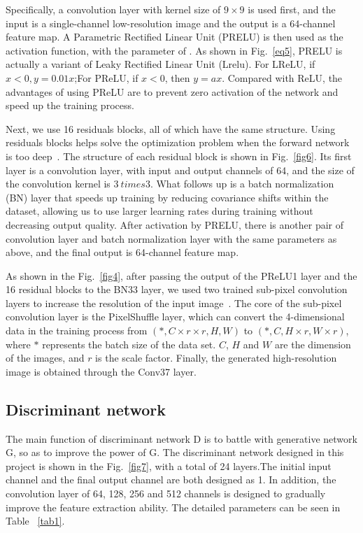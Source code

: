 \documentclass[10pt,twocolumn,letterpaper]{article}
\begin{document}
Specifically, a convolution layer with kernel size of $9\times 9$ is used first, and the input is a single-channel low-resolution image and the output is a 64-channel feature map. A Parametric Rectified Linear Unit (PRELU) is then used as the activation function, with the parameter of . As shown in Fig.~\ref{eq5}, PRELU is actually a variant of Leaky Rectified Linear Unit (Lrelu). For LReLU, if $x<0, y=0.01x$;For PReLU, if $x<0$, then $y=ax$. Compared with ReLU, the advantages of using PReLU are to prevent zero activation of the network and speed up the training process.

Next, we use 16 residuals blocks, all of which have the same structure. Using residuals blocks helps solve the optimization problem when the forward network is too deep~\cite{gross2016training}. The structure of each residual block is shown in Fig.~\ref{fig6}. Its first layer is a convolution layer, with input and output channels of 64, and the size of the convolution kernel is $3 \ times 3$. What follows up is a batch normalization (BN) layer that speeds up training by reducing covariance shifts within the dataset, allowing us to use larger learning rates during training without decreasing output quality\cite{ioffe2015batch}. After activation by PRELU, there is another pair of convolution layer and batch normalization layer with the same parameters as above, and the final output is 64-channel feature map.

As shown in the Fig.~\ref{fig4}, after passing the output of the PReLU1 layer and the 16 residual blocks to the BN33 layer, we used two trained sub-pixel convolution layers to increase the resolution of the input image~\cite{shi2016real}. The core of the sub-pixel convolution layer is the PixelShuffle layer, which can convert the 4-dimensional data in the training process from $(*,C\times r\times r,H,W)$ to $(*,C,H\times r,W\times r)$, where $*$ represents the batch size of the data set. $C$, $H$ and $W$ are the dimension of the images, and $r$ is the scale factor. Finally, the generated high-resolution image is obtained through the Conv37 layer.

\subsection{Discriminant network}
The main function of discriminant network D is to battle with generative network G, so as to improve the power of G. The discriminant network designed in this project is shown in the Fig.~\ref{fig7}, with a total of 24 layers.The initial input channel and the final output channel are both designed as 1. In addition, the convolution layer of 64, 128, 256 and 512 channels is designed to gradually improve the feature extraction ability. The detailed parameters can be seen in Table ~\ref{tab1}.
\end{document}
